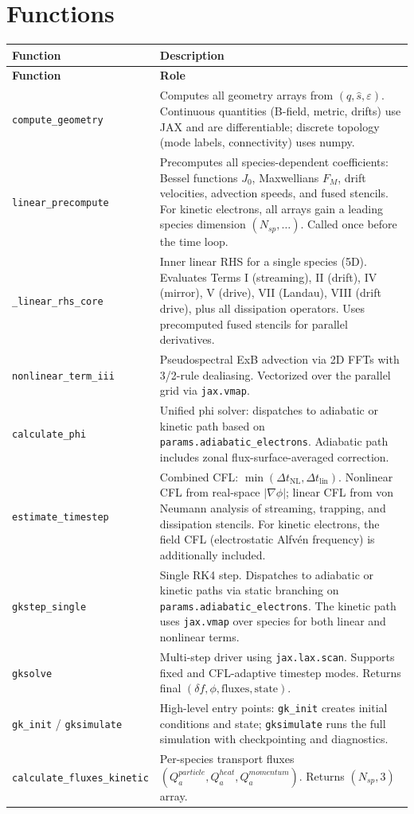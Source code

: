 \documentclass{article}
\theoremstyle{plain}
\theoremstyle{definition}
\theoremstyle{remark}
\begin{document}
\section{Functions} \label{sec:functions}
\renewcommand{\arraystretch}{1.4}
\begin{longtable}{p{} p{}}
\toprule
\textbf{Function} & \textbf{Description} \\
\midrule
\endfirsthead
\toprule
\textbf{Function} & \textbf{Role} \\
\midrule
\endhead
\bottomrule
\endfoot
\texttt{compute\_geometry} & Computes all geometry arrays from $(q, \hat{s}, \varepsilon)$. Continuous quantities (B-field, metric, drifts) use JAX and are differentiable; discrete topology (mode labels, connectivity) uses numpy. \\
\texttt{linear\_precompute} & Precomputes all species-dependent coefficients: Bessel functions $J_0$, Maxwellians $F_M$, drift velocities, advection speeds, and fused stencils. For kinetic electrons, all arrays gain a leading species dimension $(N_{sp}, \ldots)$. Called once before the time loop. \\
\texttt{\_linear\_rhs\_core} & Inner linear RHS for a single species (5D). Evaluates Terms I (streaming), II (drift), IV (mirror), V (drive), VII (Landau), VIII (drift drive), plus all dissipation operators. Uses precomputed fused stencils for parallel derivatives. \\
\texttt{nonlinear\_term\_iii} & Pseudospectral ExB advection via 2D FFTs with 3/2-rule dealiasing. Vectorized over the parallel grid via \texttt{jax.vmap}. \\
\texttt{calculate\_phi} & Unified phi solver: dispatches to adiabatic or kinetic path based on \texttt{params.adiabatic\_electrons}. Adiabatic path includes zonal flux-surface-averaged correction. \\
\texttt{estimate\_timestep} & Combined CFL: $\min(\Delta t_\text{NL}, \Delta t_\text{lin})$. Nonlinear CFL from real-space $|\nabla\phi|$; linear CFL from von Neumann analysis of streaming, trapping, and dissipation stencils. For kinetic electrons, the field CFL (electrostatic Alfv\'en frequency) is additionally included. \\
\texttt{gkstep\_single} & Single RK4 step. Dispatches to adiabatic or kinetic paths via static branching on \texttt{params.adiabatic\_electrons}. The kinetic path uses \texttt{jax.vmap} over species for both linear and nonlinear terms. \\
\texttt{gksolve} & Multi-step driver using \texttt{jax.lax.scan}. Supports fixed and CFL-adaptive timestep modes. Returns final $(\delta f, \phi, \text{fluxes}, \text{state})$. \\
\texttt{gk\_init} / \texttt{gksimulate} & High-level entry points: \texttt{gk\_init} creates initial conditions and state; \texttt{gksimulate} runs the full simulation with checkpointing and diagnostics. \\
\texttt{calculate\_fluxes\_kinetic} & Per-species transport fluxes $(Q_a^{particle}, Q_a^{heat}, Q_a^{momentum})$. Returns $(N_{sp}, 3)$ array. \\
\bottomrule
\end{longtable}
\renewcommand{\arraystretch}{1.0}
\end{document}
